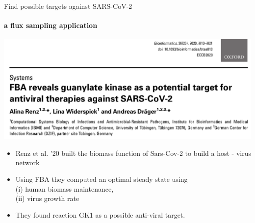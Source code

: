 \documentclass{beamer}
\begin{document}
   \begin{frame}{Find possible targets against SARS-CoV-2}
      \framesubtitle{a flux sampling application}
      \bigskip
      \includegraphics[scale=0.27]{ ../met_nets/resources//covid_paper.png}
      
      \begin{singlespace}
         \begin{itemize}
            \item \small Renz et al. '20 built the biomass function of Sars-Cov-2 to build a host - virus network
            \item \small Using FBA they computed an optimal steady state using \\ \small \quad (i) human biomass maintenance,\\ \small \quad (ii) virus growth rate
            \item \small They found reaction GK1 as a possible anti-viral target.
         \end{itemize}            
      \end{singlespace}

   \end{frame}
\end{document}
